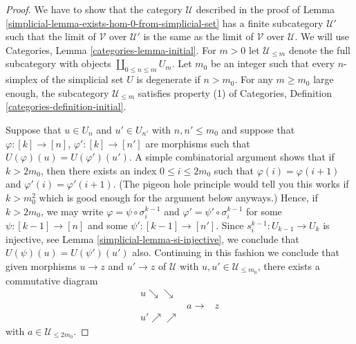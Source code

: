 \begin{proof}

We have to show that the category $\mathcal{U}$ described
in the proof of Lemma \ref{simplicial-lemma-exists-hom-0-from-simplicial-set}
has a finite subcategory $\mathcal{U}'$ such that the limit
of $\mathcal{V}$ over $\mathcal{U}'$ is the same as the
limit of $\mathcal{V}$ over $\mathcal{U}$. We will use
Categories, Lemma \ref{categories-lemma-initial}.
For $m > 0$ let $\mathcal{U}_{\leq m}$ denote the full
subcategory with objects $\coprod_{0 \leq n \leq m} U_m$.
Let $m_0$ be an integer such that every $n$-simplex
of the simplicial set $U$ is degenerate if $n > m_0$.
For any $m \geq m_0$ large enough, the subcategory
$\mathcal{U}_{\leq m}$ satisfies property (1) of
Categories, Definition \ref{categories-definition-initial}.

\medskip\noindent
Suppose that $u \in U_n$ and
$u' \in U_{n'}$ with $n, n' \leq m_0$ and suppose that
$\varphi : [k] \to [n]$, $\varphi' : [k] \to [n']$
are morphisms such that $U(\varphi)(u) = U(\varphi')(u')$.
A simple combinatorial argument shows that if $k > 2m_0$,
then there exists an index $0 \leq i \leq 2m_0$ such that
$\varphi(i) =\varphi(i + 1)$ and $\varphi'(i) = \varphi'(i + 1)$.
(The pigeon hole principle would tell you this works if
$k > m_0^2$ which is good enough for the argument below
anyways.) Hence, if $k > 2m_0$, we may write
$\varphi = \psi \circ \sigma^{k - 1}_i$ and
$\varphi' = \psi' \circ \sigma^{k - 1}_i$ for some
$\psi : [k - 1] \to [n]$ and some $\psi' : [k - 1] \to [n']$.
Since $s^{k - 1}_i : U_{k - 1} \to U_k$ is injective,
see Lemma \ref{simplicial-lemma-si-injective}, we conclude that
$U(\psi)(u) = U(\psi')(u')$ also. Continuing in this
fashion we conclude that given morphisms
$u \to z$ and $u' \to z$ of $\mathcal{U}$
with $u, u' \in \mathcal{U}_{\leq m_0}$, there exists
a commutative diagram
$$
\begin{array}{ccc}u \searrow\searrow &  &  \\  & a \longrightarrow & z \\ u' \nearrow\nearrow &  & \end{array}
$$
with $a \in \mathcal{U}_{\leq 2m_0}$.


\end{proof}
